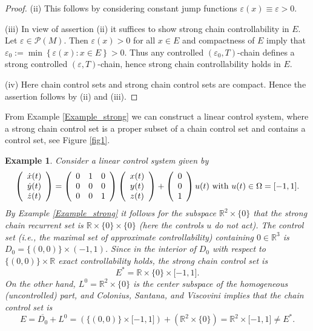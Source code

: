 \documentclass[preprint,12pt]{elsarticle}
\newtheorem{example}{Example}
\begin{document}
\begin{proof}
(ii) This follows by considering constant jump functions $\varepsilon
(x)\equiv\varepsilon>0$.

(iii) In view of assertion (ii) it suffices to show strong chain
controllability in $E$. Let $\varepsilon\in\mathcal{P}(M)$. Then
$\varepsilon(x)>0$ for all $x\in E$ and compactness of $E$ imply that
$\varepsilon_{0}:=\min\left\{  \varepsilon(x):x\in E\right\}  >0$. Thus any
controlled $(\varepsilon_{0},T)$-chain defines a strong controlled
$(\varepsilon,T)$-chain, hence strong chain controllability holds in $E$.

(iv) Here chain control sets and strong chain control sets are compact. Hence
the assertion follows by (ii) and (iii).
\end{proof}

From Example \ref{Example_strong} we can construct a linear control system,
where a strong chain control set is a proper subset of a chain control set and
contains a control set, see Figure \ref{fig1}.

\begin{example}
\label{Example_linear}Consider a linear control system given by%
\[
\left(
\begin{array}
[c]{c}%
\dot{x}(t)\\
\dot{y}(t)\\
\dot{z}(t)
\end{array}
\right)  =\left(
\begin{array}
[c]{ccc}%
0 & 1 & 0\\
0 & 0 & 0\\
0 & 0 & 1
\end{array}
\right)  \left(
\begin{array}
[c]{c}%
x(t)\\
y(t)\\
z(t)
\end{array}
\right)  +\left(
\begin{array}
[c]{c}%
0\\
0\\
1
\end{array}
\right)  u(t)\text{ with }u(t)\in\Omega=[-1,1].
\]
By Example \ref{Example_strong} it follows for the subspace $\mathbb{R}%
^{2}\times\{0\}$ that the strong chain recurrent set is $\mathbb{R}%
\times\{0\}\times\{0\}$ (here the controls $u$ do not act). The control set
(i.e., the maximal set of approximate controllability) containing
$0\in\mathbb{R}^{3}$ is $D_{0}=\{(0,0)\}\times(-1,1)$. Since in the interior
of $D_{0}$ with respect to $\{(0,0)\}\times\mathbb{R}$ exact controllability
holds, the strong chain control set is%
\[
E^{\ast}=\mathbb{R}\times\{0\}\times\lbrack-1,1].
\]
On the other hand, $L^{0}=\mathbb{R}^{2}\times\{0\}$ is the center subspace of
the homogeneous (uncontrolled) part, and Colonius, Santana, and Viscovini
\cite[Theorem 4.8]{ColSV24} implies that the chain control set is%
\[
E=\overline{D_{0}}+L^{0}=\left(  \{(0,0)\}\times\lbrack-1,1]\right)  +\left(
\mathbb{R}^{2}\times\{0\}\right)  =\mathbb{R}^{2}\times\lbrack-1,1]\not =%
E^{\ast}.
\]

\end{example}
\end{document}
